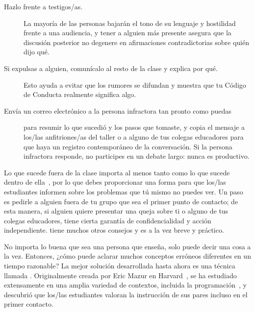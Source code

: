 \begin{description}

\item[Hazlo frente a testigos/as.]
  La mayoría de las personas bajarán el tono de su lenguaje y hostilidad frente a una audiencia,
  y tener a alguien más presente asegura que
  la discusión posterior no degenere en afirmaciones contradictorias sobre quién dijo qué.

\item[Si expulsas a alguien, comunícalo al resto de la clase y explica por qué.]
  Esto ayuda a evitar que los rumores se difundan
  y muestra que tu Código de Conducta realmente significa algo.

\item[Envía un correo electrónico a la persona infractora tan pronto como puedas]
  para resumir lo que sucedió y los pasos que tomaste,
  y copia el mensaje a los/las anfitriones/as del taller o a alguno de tus colegas educadores
  para que haya un registro contemporáneo de la conversación.
  Si la persona infractora responde,
  no participes en un debate largo:
  nunca es productivo.
 
\end{description}

Lo que sucede fuera de la clase importa al menos tanto como lo que sucede dentro de ella~\cite{Part2011},
por lo que debes proporcionar una forma para que los/las estudiantes informen sobre los problemas que tú mismo no puedes ver.
Un paso es pedirle a alguien fuera de tu grupo que sea el primer punto de contacto;
de esta manera,
si alguien quiere presentar una queja sobre ti o alguno de tus colegas educadores,
tiene cierta garantía de confidencialidad y acción independiente.
\cite{Auro2019} tiene muchos otros consejos
y es a la vez breve y práctico.


No importa lo buena que sea una persona que enseña,
solo puede decir una cosa a la vez.
Entonces, ¿cómo puede aclarar muchos conceptos erróneos diferentes en un tiempo razonable?
La mejor solución desarrollada hasta ahora es una técnica llamada .
Originalmente creada por Eric Mazur en Harvard~\cite{Mazu1996},
se ha estudiado extensamente en una amplia variedad de contextos,
incluida la programación~\cite{Crou2001,Port2013},
y~\cite{Port2016} descubrió que los/las estudiantes valoran la instrucción de sus pares incluso en el primer contacto.

